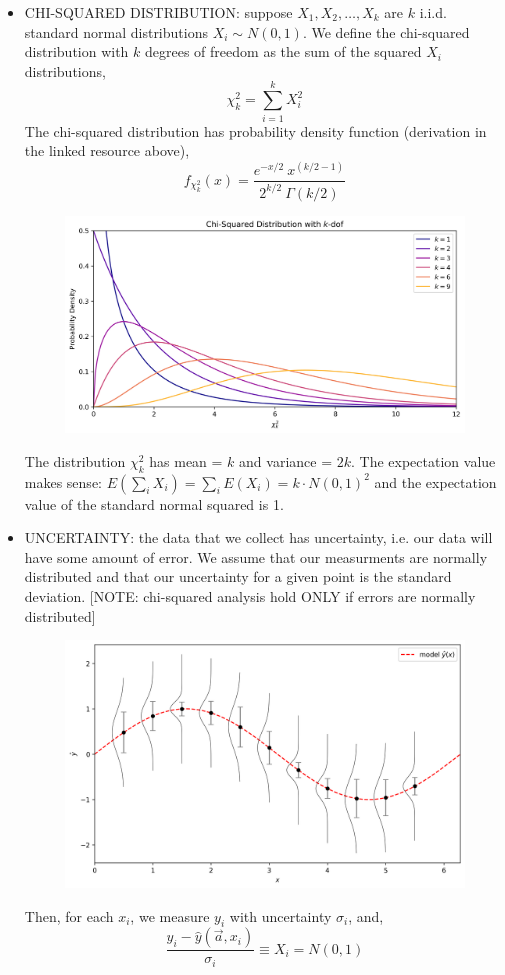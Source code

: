 \documentclass[12pt]{article}
\numberwithin{equation}{section}
\begin{document}
\begin{itemize}
\item CHI-SQUARED DISTRIBUTION: suppose $X_1, X_2, \dots, X_k$ are $k$ i.i.d. standard normal distributions $X_i\sim N(0,1)$. We define the chi-squared distribution with $k$ degrees of freedom as the sum of the squared $X_i$ distributions,
\begin{equation}
	\chi^2_k = \sum_{i=1}^{k} X_i^2
\end{equation}
The chi-squared distribution has probability density function (derivation in the linked resource above),
\begin{equation}
	f_{\chi^2_k}(x) = \frac{e^{-x/2}\ x^{(k/2-1)}}{2^{k/2}\ \Gamma(k/2)} 
\end{equation}
\begin{figure}[H]
	\centering
	\includegraphics[width=12cm] {pdf}
\end{figure}

The distribution $ \chi^2_k $ has mean = $ k $ and variance = $ 2k $. The expectation value makes sense: $ E(\sum_i X_i) = \sum_i E(X_i) = k\cdot N(0,1)^2$ and the expectation value of the standard normal squared is 1.

\item UNCERTAINTY: the data that we collect has uncertainty, i.e. our data will have some amount of error. We assume that our measurments are normally distributed and that our uncertainty for a given point is the standard deviation. [NOTE: chi-squared analysis hold ONLY if errors are normally distributed]
\begin{figure}[H]
	\centering
	\includegraphics[width=12cm] {model}
\end{figure}
Then, for each $ x_i $, we measure $ y_i $ with uncertainty $ \sigma_i $, and,
\begin{equation}
	\frac{y_i - \hat{y}(\vec{a}, x_i) }{\sigma_i} \equiv X_i = N(0,1) 
\end{equation}


\end{itemize}
\end{document}
